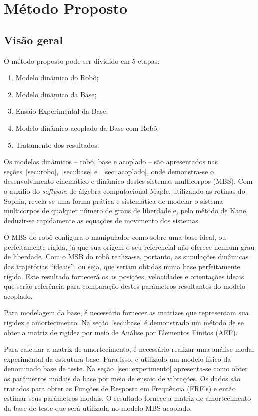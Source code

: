 \chapter{Método Proposto}



\section{Visão geral}

O método proposto pode ser dividido em 5 etapas:
%
\begin{enumerate}
  \item Modelo dinâmico do Robô;
  \item Modelo dinâmico da Base;
  \item Ensaio Experimental da Base;
  \item Modelo dinâmico acoplado da Base com Robô;
  \item Tratamento dos resultados.
\end{enumerate}

Os modelos dinâmicos -- robô, base e  acoplado -- são apresentados nas
seções~\ref{sec::robo},~\ref{sec::base} e ~\ref{sec::acoplado}, onde
demonstra-se o desenvolvimento cinemático e dinâmico destes sistemas multicorpos
(MBS).
Com o auxílio do \textit{software} de álgebra computacional Maple, utilizando as
rotinas do Sophia, revela-se uma forma prática e sistemática de modelar o
sistema multicorpos de qualquer número de graus de liberdade e, pelo método de
Kane, deduzir-se rapidamente as equações de movimento dos sistemas.

O MBS do robô configura o manipulador como sobre uma base ideal, ou
perfeitamente rígida, já que sua origem o seu referencial não oferece nenhum
grau de liberdade. Com o MSB do robô realiza-se, portanto, as simulações
dinâmicas das trajetórias ``ideais'', ou seja, que seriam obtidas numa base
perfeitamente rígida. Este resultado fornecerá os as posições, velocidades e
orientações ideais que serão referência para comparação destes parâmetros
resultantes do modelo acoplado.

Para modelagem da base, é necessário fornecer as matrizes que representam sua
rigidez e amortecimento. Na seção~\ref{sec::base} é demonstrado um método de se
obter a matriz de rigidez por meio de Análise por Elementos Finitos (AEF).

Para calcular a matriz de amortecimento, é necessário realizar uma análise modal
experimental da estrutura-base. Para isso, é utilizado um modelo físico da
denominado base de teste.
Na seção~\ref{sec::experimento} apresenta-se como obter os parâmetros modais da
base por meio de ensaio de vibrações. Os dados são tratados para obter as
Funções de Resposta em Frequência (FRF's) e então estimar seus parâmetros
modais. O resultado fornece a matriz de amortecimento da base de teste que será
utilizada no modelo MBS acoplado.

